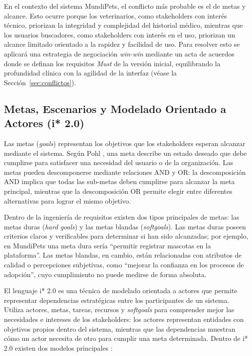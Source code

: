 \documentclass[journal,onecolumn]{IEEEtran}
\begin{document}
En el contexto del sistema MundiPets, el conflicto más probable es el de
metas y alcance. Esto ocurre porque los veterinarios, como stakeholders con
interés técnico, priorizan la integridad y complejidad del historial
médico, mientras que los usuarios buscadores, como stakeholders con interés
en el uso, priorizan un alcance limitado orientado a la rapidez y
facilidad de uso. Para resolver esto se aplicará una estrategia de
negociación \textit{win-win} mediante un acta de acuerdos donde se definan
los requisitos \textit{Must} de la versión inicial, equilibrando la
profundidad clínica con la agilidad de la interfaz (véase la
Sección~\ref{sec:conflictos}).

\subsection{Metas, Escenarios y Modelado Orientado a Actores (i* 2.0)}

Las metas (\textit{goals}) representan los objetivos que los stakeholders
esperan alcanzar mediante el sistema. Según Pohl \cite{pohl2025}, una meta
describe un estado deseado que debe cumplirse para satisfacer una necesidad
del usuario o de la organización. Las metas pueden descomponerse mediante
relaciones AND y OR: la descomposición AND implica que todas las
sub-metas deben cumplirse para alcanzar la meta principal, mientras que la
descomposición OR permite elegir entre diferentes alternativas para lograr
el mismo objetivo.

Dentro de la ingeniería de requisitos existen dos tipos principales de
metas: las metas duras (\textit{hard goals}) y las metas blandas
(\textit{softgoals}). Las metas duras poseen criterios claros y verificables
para determinar si han sido alcanzadas; por ejemplo, en MundiPets una meta
dura sería ``permitir registrar mascotas en la plataforma''. Las metas
blandas, en cambio, están relacionadas con atributos de calidad o
percepciones subjetivas, como ``mejorar la confianza en los procesos de
adopción'', cuyo cumplimiento no puede medirse de forma absoluta.

El lenguaje i* 2.0 \cite{yu2011} es una técnica de modelado orientada a
actores que permite representar dependencias estratégicas entre los
participantes de un sistema. Utiliza actores, metas, tareas, recursos y
\textit{softgoals} para comprender mejor las necesidades e intereses de los
stakeholders: los actores representan entidades con objetivos propios
dentro del sistema, mientras que las dependencias muestran cómo un actor
necesita de otro para cumplir una meta determinada. Dentro de i* 2.0
existen dos modelos principales \cite{yu2011}:
\end{document}
